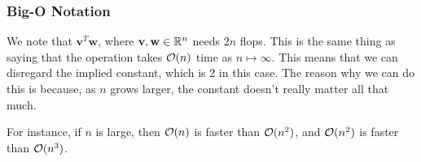 \documentclass[letterpaper]{article}
\begin{document}
\subsubsection{Big-O Notation}
We note that $\mathbf{v}^T \mathbf{w}$, where $\mathbf{v}, \mathbf{w} \in \mathbb{R}^n$ needs $2n$ flops. This is the same thing as saying that the operation takes $\mathcal{O}(n)$ time as $n \mapsto \infty$. This means that we can disregard the implied constant, which is 2 in this case. The reason why we can do this is because, as $n$ grows larger, the constant doesn't really matter all that much. 

\bigskip 

For instance, if $n$ is large, then $\mathcal{O}(n)$ is faster than $\mathcal{O}(n^2)$, and $\mathcal{O}(n^2)$ is faster than $\mathcal{O}(n^3)$. 
\end{document}
